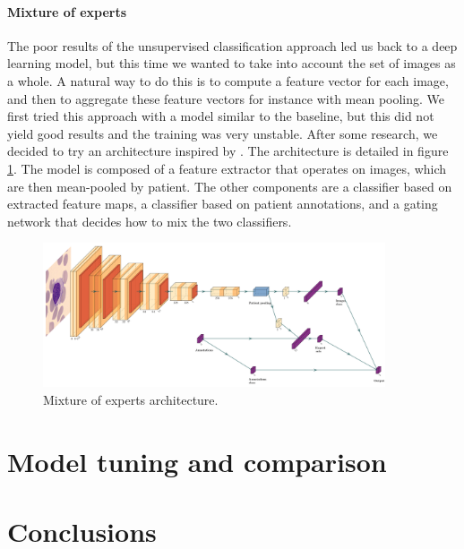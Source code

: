 \documentclass{midl}
\begin{document}
\paragraph*{Mixture of experts}
The poor results of the unsupervised classification approach led us back to a deep learning model, but this time we wanted to take into account the set of images as a whole. A natural way to do this is to compute a feature vector for each image, and then to aggregate these feature vectors for instance with mean pooling. We first tried this approach with a model similar to the baseline, but this did not yield good results and the training was very unstable. After some research, we decided to try an architecture inspired by \cite{Sahasrabudhe_2021}. The architecture is detailed in figure \ref{fig:mixture_of_experts}. The model is composed of a feature extractor that operates on images, which are then mean-pooled by patient. The other components are a classifier based on extracted feature maps, a classifier based on patient annotations, and a gating network that decides how to mix the two classifiers.

\begin{figure}[h]
    \centering
    \includegraphics[width=0.9\textwidth]{figures/moe.png}
    \caption{Mixture of experts architecture.}
    \label{fig:mixture_of_experts}
\end{figure}

\section{Model tuning and comparison}
\label{sec:evaluation}

\section{Conclusions}
\label{sec:conclusion}

\newpage


\appendix
\end{document}
